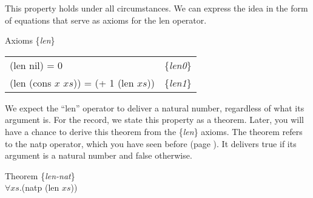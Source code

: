 This property holds under all circumstances.
We can express the idea in the form of equations
that serve as axioms for the len operator.
\begin{samepage}
\label{len-equations}
\begin{center}
Axioms \{\emph{len}\} \\
\begin{tabular}{ll}
(len nil) = 0                            & \{\emph{len0}\} \\
(len (cons $x$ $xs$)) = (+ 1 (len $xs$)) & \{\emph{len1}\}
\end{tabular}
\end{center}
\end{samepage}

\begin{comment}
We also expect the ``len'' operator to deliver a natural number, regardless of what its argument is. We can state this in the form of a theorem using the ``natp'' operator, which delivers true if its argument is a natural number and false if it isn't.

\label{len-nat-thm}
\begin{Verbatim}
(defthmd len-is-natural-number-thm
  (natp (len xs)))
\end{Verbatim}

ACL2 succeeds in proving this theorem, too, so we now know that the formula (len $xs$) delivers a non-negative integer, regardless of what formula $xs$ stands for. We will use the label \{\emph{len-nat}\} when we cite this theorem in proofs.

A related fact is that the formula (consp $xs$) is logically equivalent to the formula (\verb+>+ (len $xs$) 0). In the notation from Chapter~\ref{ch:Boolean-Formulas}: (consp $xs$)$\leftrightarrow$(\verb+>+ (len $xs$) 0). The name of the equivalence operator in ACL2 is ``iff'', so in ACL2 notation, the formula would be:
(iff (consp $xs$) (\verb+>+ (len $xs$) 0)). Or, stated as a theorem, it looks like this:

\begin{Verbatim}
(defthmd consp<->len>0-thm
  (iff (consp xs) (> (len xs) 0)))
\end{Verbatim}
\end{comment}

We expect the ``len'' operator to deliver a natural number,
regardless of what its argument is.
For the record, we state this property as a theorem.
Later, you will have a chance to derive this theorem from the \{\emph{len}\} axioms.
The theorem refers to the natp operator,
which you have seen before (page \pageref{natp-op}).
It delivers true if its argument is a natural number and false otherwise.
\begin{samepage}
\label{len-nat-thm}
\begin{center}
Theorem \{\emph{len-nat}\} \\
$\forall xs.$(natp (len $xs$))
\end{center}
\end{samepage}


